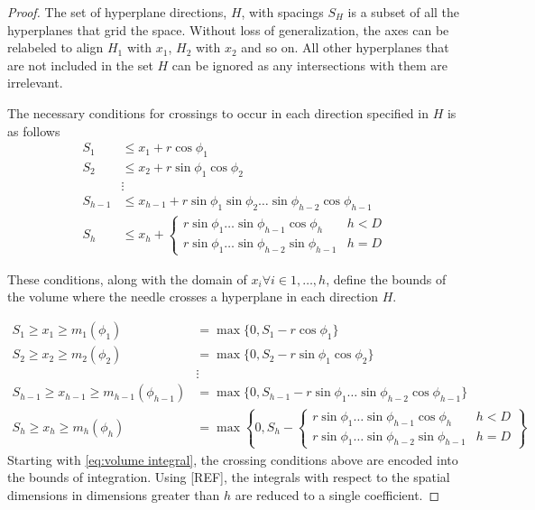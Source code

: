 \documentclass{article}
\begin{document}
\begin{proof}
	The set of hyperplane directions, $H$, with spacings $S_H$ is a subset of all the 
	hyperplanes that grid the space. Without loss of generalization, the axes can be relabeled to
	align $H_1$ with $x_1$, $H_2$ with $x_2$ and so on. All other hyperplanes that are not included
	in the set $H$ can be ignored as any intersections with them are irrelevant.

	The necessary conditions for crossings to occur in each direction specified in $H$ is as follows
	\begin{align}
		S_1 &\le x_1 + r\cos\phi_1\\
		S_2 &\le x_2 + r\sin\phi_1\cos\phi_2\\
		&\vdots \\
		S_{h-1} &\le x_{h-1} + r\sin\phi_1\sin\phi_2\hdots\sin\phi_{h-2}\cos\phi_{h-1}\\
		S_{h} &\le x_h + \begin{cases}
			r\sin\phi_1\hdots\sin\phi_{h-1}\cos\phi_{h} & h < D \\
			r\sin\phi_1\hdots\sin\phi_{h-2}\sin\phi_{h-1} & h = D
		\end{cases}
	\end{align}

	These conditions, along with the domain of $x_i \forall i\in {1,\hdots,h}$, define the bounds of the
	volume where the needle crosses a hyperplane in each direction $H$.
	
	\begin{align}
		S_1 \ge x_1 \ge m_1(\phi_1) &= \max\{0, S_1-r\cos\phi_1\}\\
		S_2 \ge x_2 \ge m_2(\phi_2) &= \max\{0, S_2-r\sin\phi_1\cos\phi_2\}\\
		&\vdots \\
		S_{h-1} \ge x_{h-1} \ge m_{h-1}(\phi_{h-1}) &= \max\{0, S_{h-1}-r\sin\phi_1\hdots\sin\phi_{h-2}\cos\phi_{h-1}\}\\
		S_h \ge x_h \ge m_{h}(\phi_{h}) &= \max\left\{0, S_h - \begin{cases}
			r\sin\phi_1\hdots\sin\phi_{h-1}\cos\phi_{h} & h < D\\
			r\sin\phi_1\hdots\sin\phi_{h-2}\sin\phi_{h-1} & h = D
		\end{cases} \right\}
	\end{align}
	Starting with \ref{eq:volume integral}, the crossing conditions above are encoded into
	the bounds of integration. Using [REF], the integrals with respect to the
	spatial dimensions in dimensions greater than $h$ are reduced to a single coefficient.


\end{proof}
\end{document}
